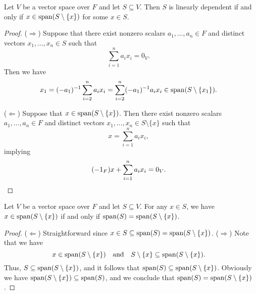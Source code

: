 \begin{lemma}
  \label{lem:linear-dependence-equivalence-first}
  Let $V$ be a vector space over $F$ and let $S \subseteq V$.
  Then $S$ is linearly dependent if and only if $x \in \operatorname{span}(S \setminus \{x\})$
  for some $x \in S$.
\end{lemma}
\begin{proof}
  ($\Rightarrow$)
  Suppose that there exist nonzero scalars $a_1, \dots, a_n \in F$ and distinct
  vectors $x_1, \dots, x_n \in S$ such that
  \begin{equation*}
    \sum_{i=1}^n a_ix_i = 0_V.
  \end{equation*}
  Then we have
  \begin{equation*}
    x_1
    = (-a_1)^{-1}\sum_{i=2}^n a_ix_i
    = \sum_{i=2}^n (-a_1)^{-1}a_ix_i
    \in \operatorname{span}(S \setminus \{x_1\}).
  \end{equation*}

  ($\Leftarrow$)
  Suppose that $x \in \operatorname{span}(S \setminus \{x\})$.
  Then there exist nonzero scalars $a_1, \dots, a_n \in F$ and distinct
  vectors $x_1, \dots, x_n \in S \setminus \{x\}$ such that
  \begin{equation*}
    x = \sum_{i=1}^n a_ix_i,
  \end{equation*}
  implying
  \begin{equation*}
    (-1_F)x + \sum_{i=1}^n a_ix_i = 0_V.
    \qedhere
  \end{equation*}
\end{proof}

\begin{lemma}
  \label{lem:linear-dependence-equivalence-second}
  Let $V$ be a vector space over $F$ and let $S \subseteq V$.
  For any $x \in S$, we have $x \in \operatorname{span}(S \setminus \{x\})$ if and only if
  $\operatorname{span}(S) = \operatorname{span}(S \setminus \{x\})$.
\end{lemma}
\begin{proof}
  ($\Leftarrow$)
  Straightforward since $x \in S \subseteq \operatorname{span}(S) = \operatorname{span}(S \setminus \{x\})$.
  ($\Rightarrow$)
  Note that we have
  \begin{equation*}
    x \in \operatorname{span}(S \setminus \{x\})
    \quad \text{and} \quad
    S \setminus \{x\} \subseteq \operatorname{span}(S \setminus \{x\}).
  \end{equation*}
  Thus, $S \subseteq \operatorname{span}(S \setminus \{x\})$, and it follows that
  $\operatorname{span}(S) \subseteq \operatorname{span}(S \setminus \{x\})$.
  Obviously we have $\operatorname{span}(S \setminus \{x\}) \subseteq \operatorname{span}(S)$, and we
  conclude that $\operatorname{span}(S) = \operatorname{span}(S \setminus \{x\})$.
\end{proof}

